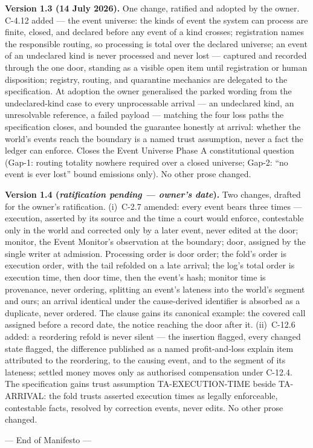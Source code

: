 \documentclass[11pt,a4paper]{article}
\begin{document}
\textbf{Version 1.3 (14 July 2026).} One change, ratified and adopted
by the owner. C-4.12 added --- the event universe: the kinds of event
the system can process are finite, closed, and declared before any
event of a kind crosses; registration names the responsible routing,
so processing is total over the declared universe; an event of an
undeclared kind is never processed and never lost --- captured and
recorded through the one door, standing as a visible open item until
registration or human disposition; registry, routing, and quarantine
mechanics are delegated to the specification. At adoption the owner
generalised the parked wording from the undeclared-kind case to every
unprocessable arrival --- an undeclared kind, an unresolvable
reference, a failed payload --- matching the four loss paths the
specification closes, and bounded the guarantee honestly at arrival:
whether the world's events reach the boundary is a named trust
assumption, never a fact the ledger can enforce. Closes the Event
Universe Phase A constitutional question (Gap-1: routing totality
nowhere required over a closed universe; Gap-2: ``no event is ever
lost'' bound emissions only). No other prose changed.

\textbf{Version 1.4 (\emph{ratification pending --- owner's date}).}
Two changes, drafted for the owner's ratification. (i)~C-2.7 amended:
every event bears three times --- execution, asserted by its source and
the time a court would enforce, contestable only in the world and
corrected only by a later event, never edited at the door; monitor, the
Event Monitor's observation at the boundary; door, assigned by the
single writer at admission. Processing order is door order; the fold's
order is execution order, with the tail refolded on a late arrival; the
log's total order is execution time, then door time, then the event's
hash; monitor time is provenance, never ordering, splitting an event's
lateness into the world's segment and ours; an arrival identical under
the cause-derived identifier is absorbed as a duplicate, never ordered.
The clause gains its canonical example: the covered call assigned
before a record date, the notice reaching the door after it.
(ii)~C-12.6 added: a reordering refold is never silent --- the
insertion flagged, every changed state flagged, the difference
published as a named profit-and-loss explain item attributed to the
reordering, to the causing event, and to the segment of its lateness;
settled money moves only as authorised compensation under C-12.4. The
specification gains trust assumption TA-EXECUTION-TIME beside
TA-ARRIVAL: the fold trusts asserted execution times as legally
enforceable, contestable facts, resolved by correction events, never
edits. No other prose changed.

--- End of Manifesto ---
\end{document}
